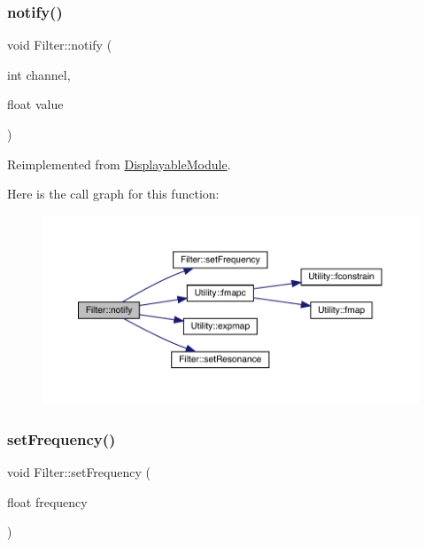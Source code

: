 \subsubsection{\texorpdfstring{notify()}{notify()}}
{\footnotesize\ttfamily void Filter\+::notify (\begin{DoxyParamCaption}\item[{int}]{channel,  }\item[{float}]{value }\end{DoxyParamCaption})\hspace{0.3cm}{\ttfamily [virtual]}}



Reimplemented from \mbox{\hyperlink{class_displayable_module_a8ae5383931f10c54cff2feef2bc07dee}{Displayable\+Module}}.

Here is the call graph for this function\+:\nopagebreak
\begin{figure}[H]
\begin{center}
\leavevmode
\includegraphics[width=350pt]{class_filter_a9cdce58ac2fe0b8beb6d561ab3725041_cgraph}
\end{center}
\end{figure}
\mbox{\label{class_filter_afe0720f8c3ed40208ebe59d894bf0645}} 
\subsubsection{\texorpdfstring{set\+Frequency()}{setFrequency()}}
{\footnotesize\ttfamily void Filter\+::set\+Frequency (\begin{DoxyParamCaption}\item[{float}]{frequency }\end{DoxyParamCaption})}

